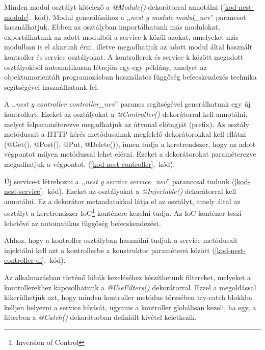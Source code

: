 \documentclass[
]{thesis-ekf}
\theoremstyle{definition}
\theoremstyle{remark}
\begin{document}
	Minden modul osztályt kötelező a \emph{@Module()} dekorátorral annotálni (\ref{kod-nest-module}.~kód). Modul generálásához a ,,\emph{nest g module modul\_nev}'' parancsot használhatjuk. Ebben az osztályban importálhatunk más modulokat, exportálhatunk az adott modulból a service-k közül azokat, amelyeket más modulban is el akarunk érni, illetve megadhatjuk az adott modul által használt kontroller és service osztályokat. A kontrollerek és service-k között megadott osztályokból automatikusan létrejön egy-egy példány, amelyet az objektumorientált programozásban használatos függőség befecskendezés technika segítségével használhatunk fel.
	
	
	
	A ,,\emph{nest g controller controller\_nev}'' parancs segítségével generálhatunk egy új kontrollert. Ezeket az osztályokat a \emph{@Controller()} dekorátorral kell annotálni, melyet felparaméterezve megadhatjuk az útvonal előtagját (prefix). Az osztály metódusait a HTTP kérés metódusainak megfelelő dekorátorokkal kell ellátni (@Get(), @Post(), @Put, @Delete()), innen tudja a keretrendszer, hogy az adott végpontot milyen metódussal lehet elérni. Ezeket a dekorátorokat paraméterezve megadhatjuk a végpontot. (\ref{kod-nest-controller}.~kód).
	
	
	
	Új service-t létrehozni a ,,\emph{nest g service service\_nev}'' paranccsal tudunk (\ref{kod-nest-service}.~kód). Ezeket az osztályokat a \emph{@Injectable()} dekorátorral kell annotálni. Ez a dekorátor metaadatokkal látja el az osztályt, amely által az osztályt a keretrendszer IoC\footnote{Inversion of Control} konténere kezelni tudja. Az IoC konténer teszi lehetővé az automatikus függőség befecskendezést.

	
	
	Ahhoz, hogy a kontroller osztályban használni tudjuk a service metódusait injektálni kell azt a kontrollerbe a konstruktor paraméterei között (\ref{kod-nest-controller-di}.~kód).
	
	
	
	Az alkalmazásban történő hibák kezeléséhez készíthetünk filtereket, melyeket a kontrollerekhez kapcsolhatunk a \emph{@UseFilters()} dekorátorral. Ezzel a megoldással kikerülhetjük azt, hogy minden kontroller metódus törzsében try-catch blokkba kelljen helyezni a service hívását, ugyanis a kontroller globálisan kezeli, ha egy, a filterben a \emph{@Catch()} dekorátorban definiált kivétel keletkezik.
	\newpage
	
\end{document}
